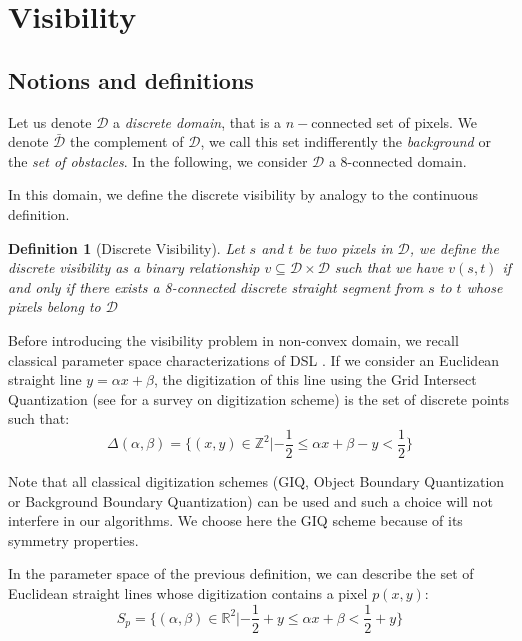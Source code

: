\documentclass[fleqn,twoside]{article}
\newtheorem{defi}{Definition}
\begin{document}
\section{Visibility}

\subsection{Notions and definitions}

Let  us denote  $\mathcal{D}$   a {\it  discrete   domain}, that is  a
$n-$connected set   of  pixels.    We denote  $\bar{\mathcal{D}}$  the
complement of $\mathcal{D}$, we  call this set indifferently  the {\it
background} or the   {\it  set of  obstacles}.  In  the following,  we
consider $\mathcal{D}$ a 8-connected domain.

In this domain, we define the discrete visibility by analogy to the continuous definition.

\begin{defi}[Discrete Visibility]
Let $s$ and $t$ be two pixels in $\mathcal{D}$, we define the discrete
visibility       as        a     binary          relationship      $v \subseteq
\mathcal{D}\times \mathcal{D}$ such that we  have $v(s,t)$  if and
only if there exists a  8-connected discrete straight segment from $s$
to $t$ whose pixels belong to $\mathcal{D}$
\end{defi}

Before introducing the   visibility problem in  non-convex domain,  we
recall   classical   parameter    space   characterizations   of   DSL
\cite{bruck93,ilroy,vittone}.  If we consider  an Euclidean  straight
line $y=\alpha x+\beta$, the digitization of this  line using the Grid
Intersect    Quantization (see   \cite{jonas97}   for  a  survey   on
digitization scheme) is the set of discrete points such that:
\begin{equation}
\Delta(\alpha,\beta)=\{ (x,y)\in \mathbb{Z}^2 | -\frac{1}{2}\leq\alpha x+\beta-y<\frac{1}{2}\}
\end{equation}

Note that all  classical  digitization schemes (GIQ,  Object  Boundary
Quantization or Background Boundary Quantization) can be used and such
a  choice  will not interfere  in  our  algorithms. We  choose here the GIQ
scheme because of its symmetry properties.

In the parameter space of the previous definition, we can describe the
set of Euclidean straight   lines  whose  digitization contains   a
pixel $p(x,y)$:
\begin{equation}
S_p=\{ (\alpha,\beta)\in \mathbb{R}^2 | -\frac{1}{2}+y\leq\alpha x+\beta<\frac{1}{2}+y\}
\end{equation}
\end{document}
